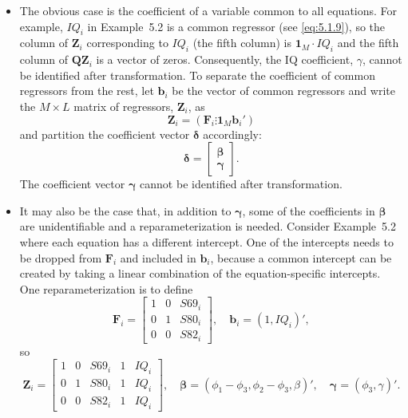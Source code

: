 \begin{itemize}
\item The obvious case is the coefficient of a variable common to all equations. For
  example, $IQ_i$ in Example~5.2 is a common regressor (see \eqref{eq:5.1.9}), so the column
  of $\mathbf{Z}_i$ corresponding to $IQ_i$ (the fifth column) is $\mathbf{1}_M \cdot IQ_i$ and the fifth
  column of $\mathbf{Q}\mathbf{Z}_i$ is a vector of zeros. Consequently, the IQ coefficient, $\gamma$, cannot
  be identified after transformation. To separate the coefficient of common
  regressors from the rest, let $\mathbf{b}_i$ be the vector of common regressors and write
  the $M \times L$ matrix of regressors, $\mathbf{Z}_i$, as
  \begin{equation}
    \mathbf{Z}_i = (\mathbf{F}_i \vdots \mathbf{1}_M \mathbf{b}_i')
    \label{eq:5.1.12} \tag{5.1.12}
  \end{equation}
  and partition the coefficient vector $\boldsymbol{\delta}$ accordingly:
  \[
    \boldsymbol{\delta} = \begin{bmatrix} \boldsymbol{\beta} \\ \boldsymbol{\gamma} \end{bmatrix}.
  \]
  The coefficient vector $\boldsymbol{\gamma}$ cannot be identified after transformation.

\item It may also be the case that, in addition to $\boldsymbol{\gamma}$, some of the coefficients in
  $\boldsymbol{\beta}$ are unidentifiable and a reparameterization is needed. Consider Example~5.2
  where each equation has a different intercept. One of the intercepts needs to be dropped
  from $\mathbf{F}_i$ and included in $\mathbf{b}_i$, because a common intercept can be created by taking
  a linear combination of the equation-specific intercepts. One reparameterization
  is to define
  \begin{equation}
    \mathbf{F}_i = \begin{bmatrix}
      1 & 0 & S69_i \\
      0 & 1 & S80_i \\
      0 & 0 & S82_i
    \end{bmatrix}, \quad
    \mathbf{b}_i = (1, IQ_i)',
    \label{eq:5.1.13} \tag{5.1.13}
  \end{equation}
  so
  \begin{equation}
    \mathbf{Z}_i = \begin{bmatrix}
      1 & 0 & S69_i & 1 & IQ_i \\
      0 & 1 & S80_i & 1 & IQ_i \\
      0 & 0 & S82_i & 1 & IQ_i
    \end{bmatrix}, \quad
    \boldsymbol{\beta} = (\phi_1 - \phi_3, \phi_2 - \phi_3, \beta)', \quad
    \boldsymbol{\gamma} = (\phi_3, \gamma)'.
    \label{eq:5.1.14} \tag{5.1.14}
  \end{equation}
\end{itemize}

